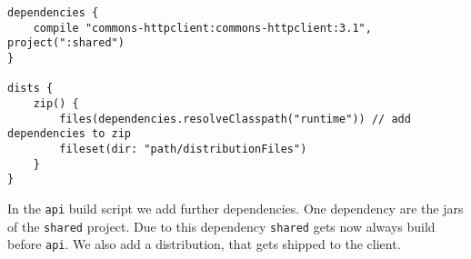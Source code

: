 \begin{Verbatim}[frame=single,label=api]
dependencies {
	compile "commons-httpclient:commons-httpclient:3.1", project(":shared")
}

dists {
	zip() {
		files(dependencies.resolveClasspath("runtime")) // add dependencies to zip
		fileset(dir: "path/distributionFiles")
	}
}
\end{Verbatim}
In the \texttt{api} build script we add further dependencies. One dependency are the jars of the \texttt{shared} project. Due to this dependency \texttt{shared} gets now always build before \texttt{api}. We also add a distribution, that gets shipped to the client.



